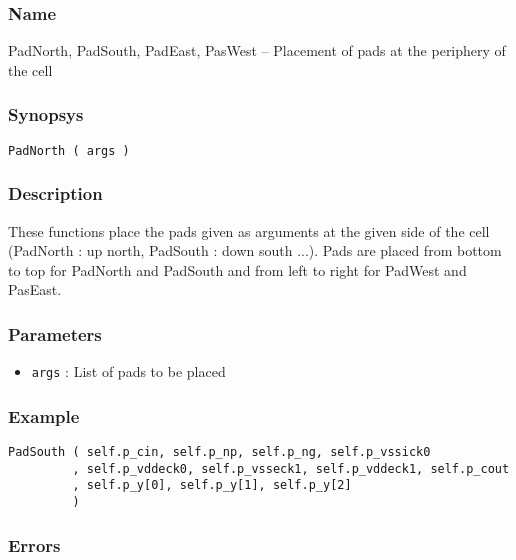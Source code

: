 \subsubsection{Name}

PadNorth, PadSouth, PadEast, PasWest -- Placement of pads at the periphery of the cell

\subsubsection{Synopsys}

\begin{verbatim}
PadNorth ( args )
\end{verbatim}

\subsubsection{Description}

These functions place the pads given as arguments at the given side of the cell (PadNorth : up north, PadSouth : down south ...).
Pads are placed from bottom to top for PadNorth and PadSouth and from left to right for PadWest and PasEast.
    
\subsubsection{Parameters}

\begin{itemize}
    \item \verb-args- : List of pads to be placed
\end{itemize}

\subsubsection{Example}

\begin{verbatim}
PadSouth ( self.p_cin, self.p_np, self.p_ng, self.p_vssick0
         , self.p_vddeck0, self.p_vsseck1, self.p_vddeck1, self.p_cout
         , self.p_y[0], self.p_y[1], self.p_y[2]
         )
\end{verbatim}

\subsubsection{Errors}

